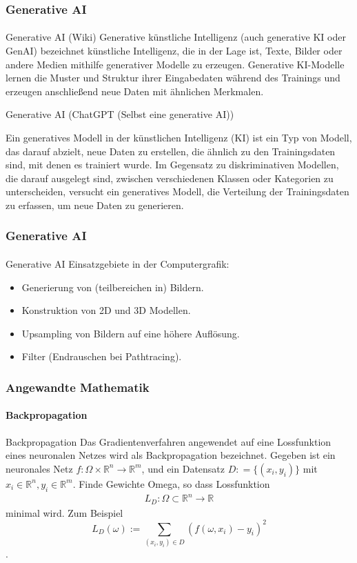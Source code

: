 \documentclass{beamer}
\begin{document}
\begin{frame}
    \frametitle{Generative AI}
\framesubtitle{}
\begin{block}{Generative AI (Wiki)}
    Generative künstliche Intelligenz (auch generative KI oder GenAI) bezeichnet künstliche Intelligenz, 
    die in der Lage ist, Texte, Bilder oder andere Medien mithilfe generativer Modelle zu erzeugen. Generative KI-Modelle lernen die Muster und Struktur ihrer Eingabedaten während des Trainings und erzeugen anschließend neue Daten mit ähnlichen Merkmalen.
\end{block}
\begin{block}{Generative AI (ChatGPT (Selbst eine generative AI))}
 
Ein generatives Modell in der künstlichen Intelligenz (KI) ist ein Typ von Modell, 
das darauf abzielt, neue Daten zu erstellen, die ähnlich zu den Trainingsdaten sind, 
mit denen es trainiert wurde. Im Gegensatz zu diskriminativen Modellen, 
die darauf ausgelegt sind, zwischen verschiedenen Klassen oder Kategorien zu unterscheiden, 
versucht ein generatives Modell, 
die Verteilung der Trainingsdaten zu erfassen, um neue Daten zu generieren.
\end{block}
\end{frame}

\begin{frame}
    \frametitle{Generative AI}
\framesubtitle{}
\begin{block}{Generative AI}
    Einsatzgebiete in der Computergrafik:
  \begin{itemize}
    \item Generierung von (teilbereichen in) Bildern.
    \item Konstruktion von 2D und 3D Modellen.
    \item Upsampling von Bildern auf eine höhere Auflösung.
    \item Filter (Endrauschen bei Pathtracing).
  \end{itemize}
\end{block}
\end{frame}


\begin{frame}
    \frametitle{Angewandte Mathematik}
\framesubtitle{Backpropagation}
    \begin{block}{Backpropagation}
Das Gradientenverfahren angewendet auf eine Lossfunktion eines neuronalen Netzes wird als Backpropagation bezeichnet.
Gegeben ist ein neuronales Netz $f : \Omega \times \mathbb{R}^n \to \mathbb{R}^m$, 
und ein  Datensatz $D : = \{ (x_i, y_i) \}$ mit $x_i \in \mathbb{R}^n, y_i \in \mathbb{R}^m$. Finde Gewichte Omega, so dass Lossfunktion
\begin{align*}
L_D  : \Omega \subset \mathbb{R}^n \to \mathbb{R} 
\end{align*}
minimal wird. Zum Beispiel $$L_D(\omega) := \sum_{(x_i,y_i) \in D} (f(\omega, x_i) - y_i)^2$$.

\end{block}
 \end{frame}
\end{document}
